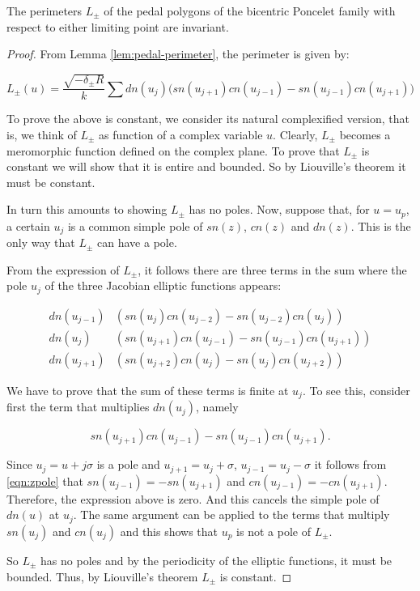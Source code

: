\begin{theorem}
The perimeters $L_\pm$ of the pedal polygons of the bicentric Poncelet family with respect to either limiting point are invariant.
\label{thm:bicentric-pedal-perimeter}
\end{theorem}

\begin{proof}
From Lemma \ref{lem:pedal-perimeter}, the perimeter is given by:

\[ L_\pm(u)=\frac{\sqrt{-\delta_{\pm}R}}{k}\sum{dn(u_{j})\Big(sn(u_{j+1})cn(u_{j-1})-sn(u_{j-1})cn(u_{j+1})\Big)} \]

To prove the above is constant, we consider its natural complexified version, that is, we think of $L_\pm$ as function of a complex variable $u$. Clearly, $L_\pm$ becomes a meromorphic function defined on the complex plane. To prove that $L_\pm$ is constant we will show that it is entire and bounded. So by Liouville's theorem it must be constant.

In turn this amounts to showing $L_\pm$ has no poles. Now, suppose that, for $u=u_p$, a certain $u_{j}$ is a common simple pole of $sn(z)$, $cn(z)$ and $dn(z)$. This is the only way that $L_\pm$ can have a pole.

From the expression of $L_\pm$, it follows there are three terms in the sum where the pole $u_{j}$ of the three Jacobian elliptic functions appears:

\begin{align*}
dn(u_{j-1})&\left(sn(u_{j})cn(u_{j-2})-sn(u_{j-2})cn(u_{j})\right)\\
dn(u_{j})&\left(sn(u_{j+1})cn(u_{j-1})-sn(u_{j-1})cn(u_{j+1})\right)\\
dn(u_{j+1})&\left(sn(u_{j+2})cn(u_{j})-sn(u_{j})cn(u_{j+2})\right)
\end{align*}

We have to prove that the sum of these terms is finite at $u_{j}$. To see this, consider first the term that multiplies $dn(u_{j})$, namely

\[sn(u_{j+1})cn(u_{j-1})-sn(u_{j-1})cn(u_{j+1}).\]

Since $u_j=u+j \sigma$ is a pole and   $u_{j+1}=u_j+ \sigma$, $u_{j-1}=u_j- \sigma$ it follows from \eqref{eqn:zpole} that  $sn(u_{j-1})=-sn(u_{j+1})$ and $cn(u_{j-1})=-cn(u_{j+1})$. Therefore, the expression above is zero. And this cancels the simple pole of $dn(u)$ at $u_{j}$. The same argument can be applied to the terms that multiply $sn(u_{j})$ and $cn(u_{j})$ and this shows that $u_p$ is not a pole of $L_\pm$. 

So $L_\pm$ has no poles and by the periodicity of the elliptic functions, it must be bounded. Thus, by Liouville's theorem $L_\pm$ is constant.
\end{proof}

